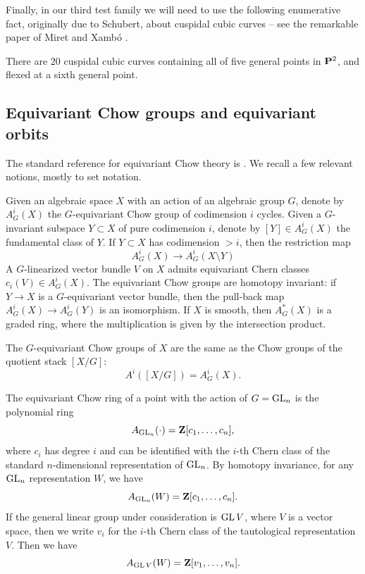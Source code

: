 \documentclass[12pt,reqno]{amsart}
\renewcommand{\to}{{\longrightarrow}}
\numberwithin{equation}{section}
\begin{document}
Finally, in our third test family we will need to use the following
enumerative fact, originally due to Schubert, about cuspidal cubic
curves -- see the remarkable paper of Miret and Xamb\'o
\cite{miret1989geometry}.

 \begin{theorem}
   \label{theorem:Schubert} There are $20$ cuspidal cubic curves
   containing all of five general points in $\P^{2}$, and flexed at a
   sixth general point.
 \end{theorem}
\subsection{Equivariant Chow groups and equivariant orbits}
The standard reference for equivariant Chow theory is \cite{edi.gra:98}.
We recall a few relevant notions, mostly to set notation.

Given an algebraic space $X$ with an action of an algebraic group $G$,
denote by $A^i_G(X)$ the $G$-equivariant Chow group of codimension $i$
cycles.  Given a $G$-invariant subspace $Y \subset X$ of pure
codimension $i$, denote by $[Y] \in A^i_G(X)$ the fundamental class of
$Y$.  If $Y \subset X$ has codimension $> i$, then the restriction map
\[ A^i_G(X) \to A^i_G(X \setminus Y)\] A $G$-linearized vector bundle
$V$ on $X$ admits equivariant Chern classes $c_i(V) \in A^i_G(X)$.
The equivariant Chow groups are homotopy invariant: if $Y \to X$ is a
$G$-equivariant vector bundle, then the pull-back map
$A^i_G(X) \to A^i_G(Y)$ is an isomorphism.  If $X$ is smooth, then
$A^*_G(X)$ is a graded ring, where the multiplication is given by the
intersection product.

The $G$-equivariant Chow groups of $X$ are the same as the Chow groups
of the quotient stack $[X/G]$:
\[ A^i\left( [X/G] \right) = A^i_G(X).\]

The equivariant Chow ring of a point with the action of $G = \GL_n$ is
the polynomial ring
\[ A_{\GL_n}(\cdot) = \Z[c_1,\dots, c_n],\] where $c_i$ has
degree $i$ and can be identified with the $i$-th Chern class of the
standard $n$-dimensional representation of $\GL_n$.  By homotopy
invariance, for any $\GL_n$ representation $W$, we have
\[ A_{\GL_n}(W) = \Z[c_1,\dots,c_n].\] If the general linear
group under consideration is $\GL V$, where $V$ is a vector space,
then we write $v_i$ for the $i$-th Chern class of the tautological
representation $V$.  Then we have
\[ A_{\GL V}(W) = \Z[v_1,\dots,v_n].\]
\end{document}
